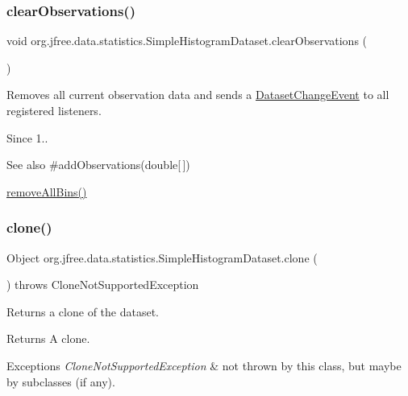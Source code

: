 \subsubsection{\texorpdfstring{clear\+Observations()}{clearObservations()}}
{\footnotesize\ttfamily void org.\+jfree.\+data.\+statistics.\+Simple\+Histogram\+Dataset.\+clear\+Observations (\begin{DoxyParamCaption}{ }\end{DoxyParamCaption})}

Removes all current observation data and sends a \mbox{\hyperlink{}{Dataset\+Change\+Event}} to all registered listeners.

\begin{DoxySince}{Since}
1..
\end{DoxySince}
\begin{DoxySeeAlso}{See also}
\#add\+Observations(double\mbox{[}$\,$\mbox{]}) 

\mbox{\hyperlink{classorg_1_1jfree_1_1data_1_1statistics_1_1_simple_histogram_dataset_a887a7d02aa9f339c8031c64a36f525bc}{remove\+All\+Bins()}} 
\end{DoxySeeAlso}
\mbox{\label{classorg_1_1jfree_1_1data_1_1statistics_1_1_simple_histogram_dataset_ad2fb603f5387b44e2525c271612aa82f}} 
\subsubsection{\texorpdfstring{clone()}{clone()}}
{\footnotesize\ttfamily Object org.\+jfree.\+data.\+statistics.\+Simple\+Histogram\+Dataset.\+clone (\begin{DoxyParamCaption}{ }\end{DoxyParamCaption}) throws Clone\+Not\+Supported\+Exception}

Returns a clone of the dataset.

\begin{DoxyReturn}{Returns}
A clone.
\end{DoxyReturn}

\begin{DoxyExceptions}{Exceptions}
{\em Clone\+Not\+Supported\+Exception} & not thrown by this class, but maybe by subclasses (if any). \\
\hline
\end{DoxyExceptions}
\mbox{\label{classorg_1_1jfree_1_1data_1_1statistics_1_1_simple_histogram_dataset_ac22edc5e1bbd03e58dc75f46eff9c6e2}} 
